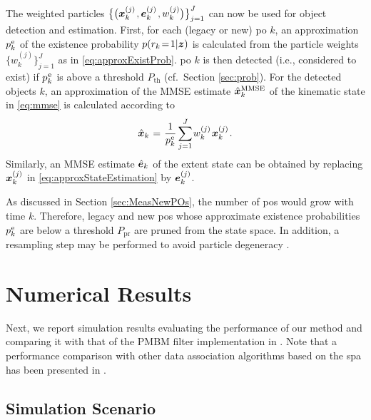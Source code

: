 \documentclass[10pt, twoside, romanappendices]{IEEEtran}
\providecommand{\ist}{\hspace*{.3mm}}
\providecommand{\rmv}{\hspace*{-.3mm}}
\providecommand{\sist}{\hspace*{.15mm}}
\begin{document}
The weighted particles $\big\{ \big( \V{x}^{(j)}_{k} \ist, \V{e}^{(j)}_{k} \ist, w^{(j)}_{k} \big) \big\}_{j=1}^{J}$ can now be used for object detection and estimation. First, for each (legacy or new) \ac{po} $k$, 
an approximation $p^{\sist\text{e}}_{k}$ of the existence probability $p(r_{k} \!=\! 1|\bm{z})$ is calculated from the particle weights $\big\{ w^{(j)}_{k} \big\}_{j=1}^{J}$ 
as in \eqref{eq:approxExistProb}. \ac{po} $k$ is then detected (i.e., considered to exist) if $p^{\sist\text{e}}_{k}$ is above a threshold $P_{\text{th}}$ (cf.\ Section \ref{sec:prob}).
For the detected objects $k$, an approximation of the MMSE estimate $\hat{\bm{x}}^\text{MMSE}_{k}$ of the kinematic state in \eqref{eq:mmse} is calculated according 
\vspace{0mm}
to
\begin{equation}
\hat{\V{x}}_{k} \ist=\ist \frac{1}{p^{\sist\text{e}}_{k}} \sum_{j=1}^{J} \rmv w_{k}^{(j)} \ist \V{x}_{k}^{(j)} \ist. 
\label{eq:approxStateEstimation}
\vspace{.5mm}
\end{equation}
Similarly, an MMSE estimate  $\hat{\bm{e}}_{k}$ of the extent state can be obtained by replacing $\bm{x}_{k}^{(j)}$ in \eqref{eq:approxStateEstimation} by $\bm{e}_{k}^{(j)}$.

As discussed in Section \ref{sec:MeasNewPOs}, the number of \acp{po} would grow with time $k$. Therefore, legacy and new \acp{po} whose approximate existence probabilities $p^{\sist\text{e}}_{k}$ are below a  threshold $P_{\text{pr}}$ are pruned \cite{MeyKroWilLauHlaBraWin:J18,Wil:J15} from the state space. In addition, a resampling step may be performed to avoid particle degeneracy \cite{DouFreGor:01,AruMasGorCla:02}.
 \vspace{-3mm}
 

\section{Numerical Results}
\label{sec:numericalResults}

Next, we report simulation results evaluating the performance of our method and comparing it with that of the PMBM filter implementation in \cite{GraBauReu:J17}. Note that a performance comparison with other data association algorithms based on the \ac{spa} has been presented in \cite{MeyWil:C20}.
\vspace{-2mm}

\subsection{Simulation Scenario}
 \vspace{-.5mm}
\label{sec:simScenarion}
\end{document}
